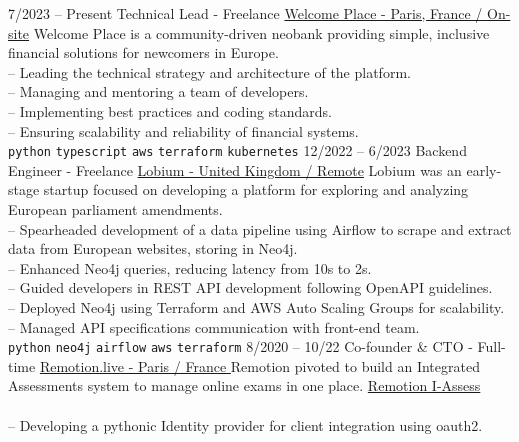 \documentclass[9pt]{developercv}
\begin{document}
\begin{entrylist}
	\entry
	{7/2023 -- Present}
	{Technical Lead - Freelance}
	{
		\href{https://www.linkedin.com/company/welcome-place/}{Welcome Place - Paris, France / On-site}}
	{
		Welcome Place is a community-driven neobank providing simple, inclusive financial solutions for newcomers in Europe. \\
		-- Leading the technical strategy and architecture of the platform. \\
		-- Managing and mentoring a team of developers. \\
		-- Implementing best practices and coding standards. \\
		-- Ensuring scalability and reliability of financial systems. \\
		\texttt{python}\slashsep
		\texttt{typescript}\slashsep
		\texttt{aws}\slashsep
		\texttt{terraform}\slashsep
		\texttt{kubernetes}
	}
		\entry
	{12/2022 -- 6/2023}
	{Backend Engineer - Freelance}
	{
		\href{https://www.linkedin.com/company/lobium/}{Lobium - United Kingdom / Remote}}
	{
		Lobium was an early-stage startup focused on developing a platform for exploring and analyzing European parliament amendments. \\
		-- Spearheaded development of a data pipeline using Airflow to scrape and extract data from European websites, storing in Neo4j. \\
		-- Enhanced Neo4j queries, reducing latency from 10s to 2s. \\
		-- Guided developers in REST API development following OpenAPI guidelines. \\
		-- Deployed Neo4j using Terraform and AWS Auto Scaling Groups for scalability. \\
		-- Managed API specifications communication with front-end team. \\
		\texttt{python}\slashsep
		\texttt{neo4j}\slashsep
		\texttt{airflow}\slashsep
		\texttt{aws}\slashsep
		\texttt{terraform}
	}
	\entry
	{8/2020 -- 10/22}
	{Co-founder \& CTO - Full-time}
	{\href{https://remotion.live/}{Remotion.live - Paris / France }}
	{Remotion pivoted to build an Integrated Assessments system to manage online exams in one place.
		\href{https://remotion.live/} {Remotion I-Assess} \\\\
		-- Developing a pythonic Identity provider for client integration using oauth2. \\
}
\end{entrylist}
\end{document}
